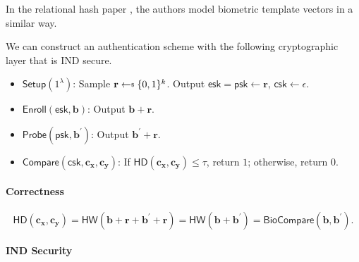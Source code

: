 In the relational hash paper \cite{cryptoeprint:2014/394}, the authors model biometric template vectors in a similar way.

We can construct an authentication scheme with the following cryptographic layer that is IND secure.

\begin{itemize}

	\item $\textsf{Setup} (1^\lambda)$: Sample $\mathbf{r} \getsdollar \{0, 1\}^k$. Output $\textsf{esk} = \textsf{psk} \gets \mathbf{r}$, $\textsf{csk} \gets \epsilon$.

	\item $\textsf{Enroll}(\textsf{esk}, \mathbf{b})$: Output $\mathbf{b} + \mathbf{r}$.
	
	\item $\textsf{Probe}(\textsf{psk}, \mathbf{b}^\prime)$: Output $\mathbf{b}^\prime + \mathbf{r}$.

	\item $\textsf{Compare} (\textsf{csk}, \mathbf{c_x}, \mathbf{c_y})$: If $\textsf{HD}(\mathbf{c_x}, \mathbf{c_y}) \leq \tau$, return $1$; otherwise, return $0$. 

\end{itemize}

\paragraph{Correctness} 
\[
	\textsf{HD}(\mathbf{c_x}, \mathbf{c_y}) = \textsf{HW}(\mathbf{b} + \mathbf{r} + \mathbf{b}^\prime + \mathbf{r}) = \textsf{HW}(\mathbf{b} + \mathbf{b}^\prime) = \textsf{BioCompare}(\mathbf{b}, \mathbf{b}^\prime).
\]

\paragraph{IND Security}

